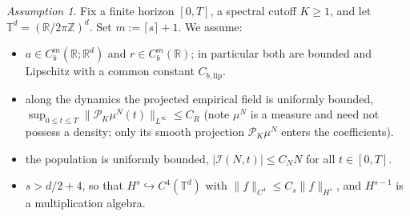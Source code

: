 \documentclass[a4paper,fleqn]{cas-sc}
\theoremstyle{definition}
\theoremstyle{remark}
\newtheorem{assumption}{Assumption}
\begin{document}
\begin{assumption}\label{ass:time}
Fix a finite horizon $[0,T]$, a spectral cutoff $K\ge1$, and let
$\mathbb T^d=(\mathbb R/2\pi\mathbb Z)^d$. Set $m:=\lceil s\rceil+1$. We assume:
\begin{itemize}
\item[(B1)] $a\in C^m_b(\mathbb R;\mathbb R^d)$ and $r\in C^m_b(\mathbb R)$;
in particular both are bounded and Lipschitz with a common constant
$C_{b,\mathrm{lip}}$.
\item[(B2)] along the dynamics the projected empirical field is uniformly bounded,
$\sup_{0\le t\le T}\|\mathcal P_K\mu^N(t)\|_{L^\infty}\le C_R$ (note $\mu^N$ is a
measure and need not possess a density; only its smooth projection
$\mathcal P_K\mu^N$ enters the coefficients).
\item[(B3)] the population is uniformly bounded, $|\mathcal I(N,t)|\le C_N N$ for all
$t\in[0,T]$.
\item[(B4)] $s>d/2+4$, so that $H^s\hookrightarrow C^4(\mathbb T^d)$ with
$\|f\|_{C^4}\le C_s\|f\|_{H^s}$, and $H^{s-1}$ is a multiplication algebra.
\end{itemize}
\end{assumption}
\end{document}
